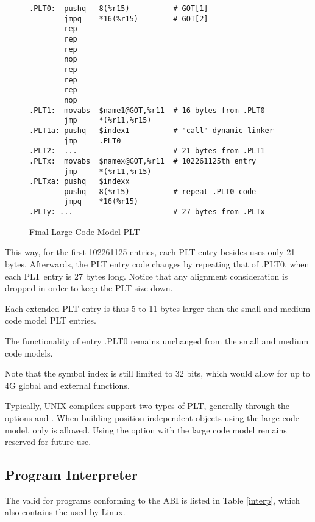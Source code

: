 \begin{figure}[H]
\Hrule
\caption{Final Large Code Model PLT} \label{final_large_plt}
\begin{footnotesize}
\begin{verbatim}
.PLT0:  pushq   8(%r15)          # GOT[1]
        jmpq    *16(%r15)        # GOT[2]
        rep
        rep
        rep
        nop
        rep
        rep
        rep
        nop
.PLT1:  movabs  $name1@GOT,%r11  # 16 bytes from .PLT0
        jmp     *(%r11,%r15)
.PLT1a: pushq   $index1          # "call" dynamic linker
        jmp     .PLT0
.PLT2:  ...                      # 21 bytes from .PLT1
.PLTx:  movabs  $namex@GOT,%r11  # 102261125th entry
        jmp     *(%r11,%r15)
.PLTxa: pushq   $indexx
        pushq   8(%r15)          # repeat .PLT0 code
        jmpq    *16(%r15)
.PLTy: ...                       # 27 bytes from .PLTx
\end{verbatim}%
\end{footnotesize}
\end{figure} 

This way, for the first 102261125 entries, each PLT entry besides
 uses only 21 bytes. Afterwards, the PLT entry code changes
by repeating that of .PLT0, when each PLT entry is 27
bytes long.  Notice that any alignment consideration is dropped in order
to keep the PLT size down.

Each extended PLT entry is thus 5 to 11 bytes larger than the small and
medium code model PLT entries.

The functionality of entry .PLT0 remains unchanged from the small and
medium code models.

Note that the symbol index is still limited to 32 bits, which would
allow for up to 4G global and external functions.

Typically, UNIX compilers support two types of PLT, generally through
the options  and .  When building position-independent
objects using the large code model, only  is allowed. Using the
option  with the large code model remains reserved for future
use.


\subsection{Program Interpreter}

The valid  for programs conforming to the
\xARCH ABI is listed in Table \ref{interp}, which also contains the
 used by Linux.

